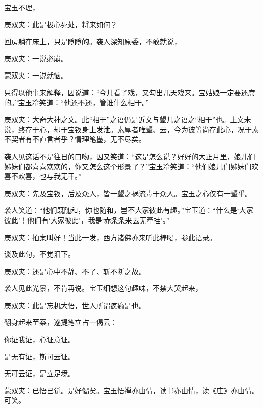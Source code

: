 \begin{parag}
    宝玉不理，\begin{note}庚双夹：此是极心死处，将来如何？\end{note}回房躺在床上，只是瞪瞪的。袭人深知原委，不敢就说，\begin{note}庚双夹：一说必崩。\end{note}\begin{note}蒙双夹：一说就恼。\end{note}只得以他事来解释，因说道：“今儿看了戏，又勾出几天戏来。宝姑娘一定要还席的。”宝玉冷笑道：“他还不还，管谁什么相干。”\begin{note}庚双夹：大奇大神之文。此“相干”之语仍是近文与颦儿之语之“相干”也。上文未说，终存于心，却于宝钗身上发泄。素厚者唯颦、云，今为彼等尚存此心，况于素不契者有不直言者乎？情理笔墨，无不尽矣。\end{note}袭人见这话不是往日的口吻，因又笑道：“这是怎么说？好好的大正月里，娘儿们姊妹们都喜喜欢欢的，你又怎么这个形景了？”宝玉冷笑道：“他们娘儿们姊妹们欢喜不欢喜，也与我无干。”\begin{note}庚双夹：先及宝钗，后及众人，皆一颦之祸流毒于众人。宝玉之心仅有一颦乎。\end{note}袭人笑道：“他们既随和，你也随和，岂不大家彼此有趣。”宝玉道：“什么是‘大家彼此’！他们有‘大家彼此’，我是‘赤条条来去无牵挂’。”\begin{note}庚双夹：拍案叫好！当此一发，西方诸佛亦来听此棒喝，参此语录。\end{note}谈及此句，不觉泪下。\begin{note}庚双夹：还是心中不静、不了、斩不断之故。\end{note}袭人见此光景，不肯再说。宝玉细想这句趣味，不禁大哭起来，\begin{note}庚双夹：此是忘机大悟，世人所谓疯癫是也。\end{note}翻身起来至案，遂提笔立占一偈云：
\end{parag}


\begin{poem}
    \begin{pl}你证我证，心证意证。\end{pl}

    \begin{pl}是无有证，斯可云证。\end{pl}

    \begin{pl}无可云证，是立足境。\end{pl}
    \begin{note}蒙双夹：已悟已觉。是好偈矣。宝玉悟禅亦由情，读书亦由情，读《庄》亦由情。可笑。\end{note}
\end{poem}


